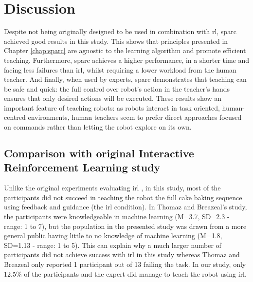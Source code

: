 \section{Discussion}
\label{sec:control_discussion}

Despite not being originally designed to be used in combination with \acrlong{rl}, \gls{sparc} achieved good results in this study. This shows that principles presented in Chapter \ref{chap:sparc} are agnostic to the learning algorithm and promote efficient teaching. Furthermore, \gls{sparc} achieves a higher performance, in a shorter time and facing less failures than \gls{irl}, whilst requiring a lower workload from the human teacher. And finally, when used by experts, \gls{sparc} demonstrates that teaching can be safe and quick: the full control over robot's action in the teacher's hands ensures that only desired actions will be executed. These results show an important feature of teaching robots: as robots interact in task oriented, human-centred environments, human teachers seem to prefer direct approaches focused on commands rather than letting the robot explore on its own.

\subsection{Comparison with original Interactive Reinforcement Learning study}

Unlike the original experiments evaluating \gls{irl} \citep{thomaz2008teachable}, in this study, most of the participants did not succeed in teaching the robot the full cake baking sequence using feedback and guidance (the \gls{irl} condition). In Thomaz and Breazeal's study, the participants were knowledgeable in machine learning (M=3.7, SD=2.3 - range: 1 to 7), but the population in the presented study was drawn from a more general public having little to no knowledge of machine learning (M=1.8, SD=1.13 - range: 1 to 5). This can explain why a much larger number of participants did not achieve success with \gls{irl} in this study whereas Thomaz and Breazeal only reported 1 participant out of 13 failing the task. In our study, only 12.5\% of the participants and the expert did manage to teach the robot using \gls{irl}. 

